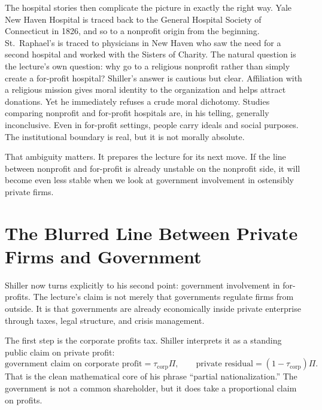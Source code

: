 The hospital stories then complicate the picture in exactly the right way. Yale New Haven Hospital is traced back to the General Hospital Society of Connecticut in 1826, and so to a nonprofit origin from the beginning. St.\ Raphael's is traced to physicians in New Haven who saw the need for a second hospital and worked with the Sisters of Charity. The natural question is the lecture's own question: why go to a religious nonprofit rather than simply create a for-profit hospital? Shiller's answer is cautious but clear. Affiliation with a religious mission gives moral identity to the organization and helps attract donations. Yet he immediately refuses a crude moral dichotomy. Studies comparing nonprofit and for-profit hospitals are, in his telling, generally inconclusive. Even in for-profit settings, people carry ideals and social purposes. The institutional boundary is real, but it is not morally absolute.

That ambiguity matters. It prepares the lecture for its next move. If the line between nonprofit and for-profit is already unstable on the nonprofit side, it will become even less stable when we look at government involvement in ostensibly private firms.

\section{The Blurred Line Between Private Firms and Government}

Shiller now turns explicitly to his second point: government involvement in for-profits. The lecture's claim is not merely that governments regulate firms from outside. It is that governments are already economically inside private enterprise through taxes, legal structure, and crisis management.

The first step is the corporate profits tax. Shiller interprets it as a standing public claim on private profit:
\begin{equation}
\text{government claim on corporate profit}=\tau_{\text{corp}}\Pi,
\qquad
\text{private residual}=(1-\tau_{\text{corp}})\Pi.
\end{equation}
That is the clean mathematical core of his phrase ``partial nationalization.'' The government is not a common shareholder, but it does take a proportional claim on profits.

